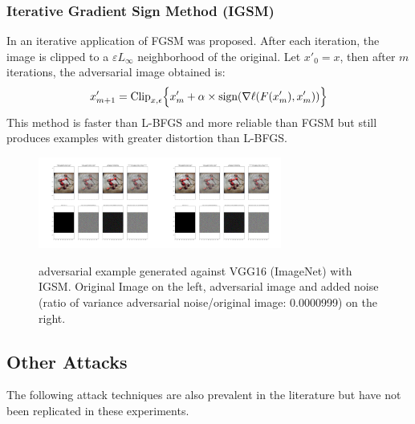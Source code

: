 \documentclass[10pt]{extarticle}
\newcommand{\sign}{\text{sign}}
\newcommand{\e}{\varepsilon}
\begin{document}
\subsubsection{Iterative Gradient Sign Method (IGSM)}
\label{igsm-s}
In \cite{kurakin_adversarial_2016}
  an iterative application of FGSM was proposed. After each
  iteration, the image is clipped to a $\e L_\infty$ neighborhood of the original. Let $x'_0 = x$, then after $m$ iterations, the adversarial image obtained is:
\begin{equation}
x_{m+1}' = \text{Clip}_{x,\epsilon} \Bigl\{x_m' + \alpha \times \text{sign}(\nabla \ell (F(x'_m),x'_m))  \Bigr\} 
\label{igsm}
\end{equation}
This method is faster than L-BFGS and more reliable than FGSM but still produces examples with greater distortion than L-BFGS. 
\begin{figure}[H]
  \centering
\includegraphics[trim=200 110 1200 102, clip,width=4cm]{2019-04-10-adverse/ILSVRC2012_val_00002900summary_plot.png}\includegraphics[trim=900 110 500 102, clip,width=4cm]{2019-04-10-adverse/ILSVRC2012_val_00002900summary_plot.png}
\caption{adversarial example generated against VGG16 (ImageNet) with IGSM. Original Image on the left, adversarial image and added noise (ratio of variance adversarial noise/original image: 0.0000999) on the right. }
\label{fgsmhip}
\end{figure}



\subsection{Other Attacks}
The following attack techniques are also prevalent in the literature but have not been replicated in these experiments. 
\end{document}
